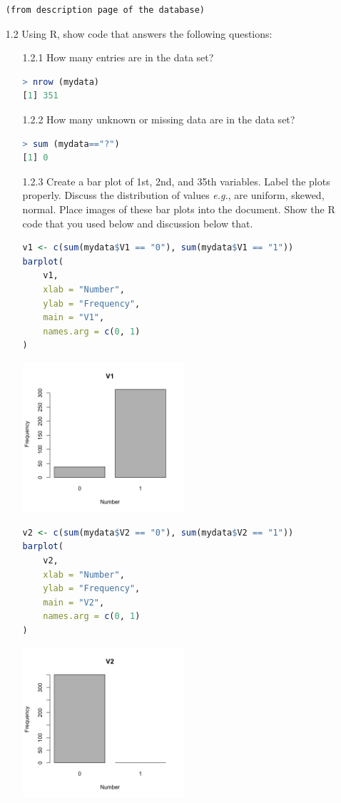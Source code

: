 \documentclass{article}
\begin{document}
\begin{enumerate}
\begin{verbatim}
(from description page of the database)
\end{verbatim}
\item[1.2]  Using R, show code that answers the following questions:
\begin{enumerate}
\item[1.2.1]   How many entries are in the data set? 
\begin{lstlisting}[language=R]
> nrow (mydata)
[1] 351
\end{lstlisting}
\item[1.2.2]   How many unknown or missing data are in the data set? 
\begin{lstlisting}[language=R]
> sum (mydata=="?")
[1] 0
\end{lstlisting}
\pagebreak
\item[1.2.3] Create a bar plot  of 1st, 2nd, and 35th variables. Label the plots properly. Discuss the distribution of values \textit{e.g.}, are uniform, skewed, normal.  Place images of these bar plots into the document.   Show the R code that you used below and discussion below that. 
\begin{lstlisting}[language=R]
v1 <- c(sum(mydata$V1 == "0"), sum(mydata$V1 == "1"))
barplot(
    v1,
    xlab = "Number",
    ylab = "Frequency",
    main = "V1",
    names.arg = c(0, 1)
)
\end{lstlisting}
\includegraphics[width=6cm]{v1.png}
\begin{lstlisting}[language=R]
v2 <- c(sum(mydata$V2 == "0"), sum(mydata$V2 == "1"))
barplot(
    v2,
    xlab = "Number",
    ylab = "Frequency",
    main = "V2",
    names.arg = c(0, 1)
)
\end{lstlisting}
\includegraphics[width=6cm]{v2.png}

\end{enumerate}
\end{enumerate}
\end{document}
